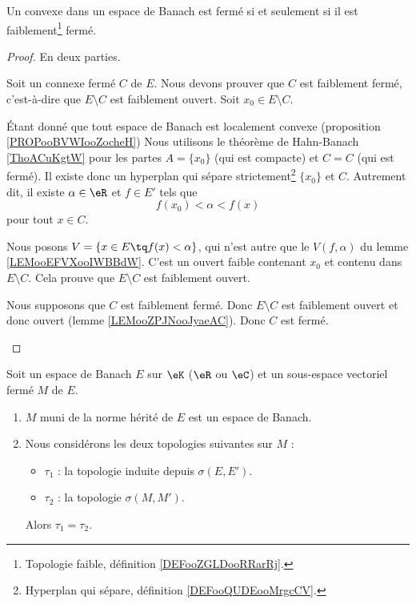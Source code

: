 \begin{proposition}       \label{PROPooYARHooOpmztY}
	Un convexe dans un espace de Banach est fermé si et seulement si il est faiblement\footnote{Topologie faible, définition \ref{DEFooZGLDooRRarRj}.} fermé.
\end{proposition}

\begin{proof}
	En deux parties.
	\begin{subproof}
		\spitem[\( \Rightarrow\)]
		Soit un connexe fermé \( C\) de \( E\). Nous devons prouver que \( C\) est faiblement fermé, c'est-à-dire que \( E\setminus C\) est faiblement ouvert. Soit \( x_0\in E\setminus C\).

		Étant donné que tout espace de Banach est localement convexe (proposition \ref{PROPooBVWIooZocheH}) Nous utilisons le théorème de Hahn-Banach \ref{ThoACuKgtW} pour les partes \( A=\{ x_0 \}\) (qui est compacte) et \( C=C\) (qui est fermé). Il existe donc un hyperplan qui sépare strictement\footnote{Hyperplan qui sépare, définition \ref{DEFooQUDEooMrgcCV}.} \( \{ x_0 \}\) et \( C\). Autrement dit, il existe \( \alpha\in \eR\) et \( f\in E'\) tels que
		\begin{equation}
			f(x_0)<\alpha<f(x)
		\end{equation}
		pour tout \( x\in C\).

		Nous posons \( V=\{ x\in E\tq f(x)<\alpha \}\), qui n'est autre que le \( V(f,\alpha)\) du lemme \ref{LEMooEFVXooIWBBdW}. C'est un ouvert faible contenant \( x_0\) et contenu dans \( E\setminus C\). Cela prouve que \( E\setminus C\) est faiblement ouvert.

		\spitem[\( \Leftarrow\)]
		Nous supposons que \( C\) est faiblement fermé. Donc \( E\setminus C\) est faiblement ouvert et donc ouvert (lemme \ref{LEMooZPJNooJyaeAC}). Donc \( C\) est fermé.
	\end{subproof}
\end{proof}

\begin{proposition}	\label{PROPooGQLOooNSgZnZ}
	Soit un espace de Banach \( E\) sur \( \eK\) (\( \eR\) ou \( \eC\)) et un sous-espace vectoriel fermé \( M\) de \( E\).
	\begin{enumerate}
		\item
		      \( M\) muni de la norme hérité de \( E\) est un espace de Banach.
		\item
		      Nous considérons les deux topologies suivantes sur \( M\) :
		      \begin{itemize}
			      \item
			            \( \tau_1\) : la topologie induite depuis \( \sigma(E,E')\).
			      \item
			            \( \tau_2\) : la topologie \( \sigma(M,M')\).
		      \end{itemize}
		      Alors \( \tau_1=\tau_2\).
	\end{enumerate}
\end{proposition}

